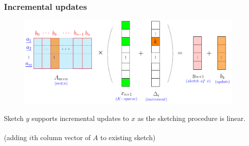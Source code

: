 \begin{frame}\frametitle{Incremental updates}

	\begin{figure}[t]
		\centering
		\includegraphics[width=4.7in]{./Figures/A_times_X_columns_Stream_inc.pdf}
	\end{figure}

\begin{block}{}

Sketch $y$ {\color{blue} supports incremental updates} to $x$ as the sketching procedure is linear. \\
\\ (adding $i$th column vector of $A$ to existing sketch)

\end{block}				
	
	
%					
%						

	
\end{frame}


